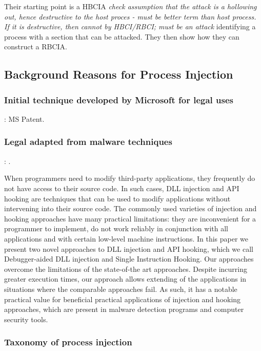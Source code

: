 \documentclass{article}
\begin{document}
Their starting point is a HBCIA \textit{check assumption that the attack is a hollowing out, hence destructive to the host proces - must be better term than host process. If it is destructive, then cannot by HBCI/RBCI; must be an attack} identifying a process with a section that can be attacked.  They then show how they can construct a RBCIA.


\subsection{Background Reasons for Process Injection}


\subsubsection{Initial technique developed by Microsoft for legal uses}

\textbf{}: \textcite{Ghizzoni:2004} MS Patent.


\subsubsection{Legal adapted from malware techniques}

\textbf{}: \textcite{Berdajs:2010}.

When programmers need to modify third-party applications, they frequently do not have access to their source code. In such cases, DLL injection and API hooking are techniques that can be used to modify applications without intervening into their source code. The commonly used varieties of injection and hooking approaches have many practical limitations: they are inconvenient for a programmer to implement, do not work reliably in conjunction with all applications and with certain low-level machine instructions. In this paper we present two novel approaches to DLL injection and API hooking, which we call Debugger-aided DLL injection and Single Instruction Hooking. Our approaches overcome the limitations of the state-of-the art approaches. Despite incurring greater execution times, our approach allows extending of the applications in situations where the comparable approaches fail. As such, it has a notable practical value for beneficial practical applications of injection and hooking approaches, which are present in malware detection programs and computer security tools.


\subsubsection{Taxonomy of process injection}
\end{document}
